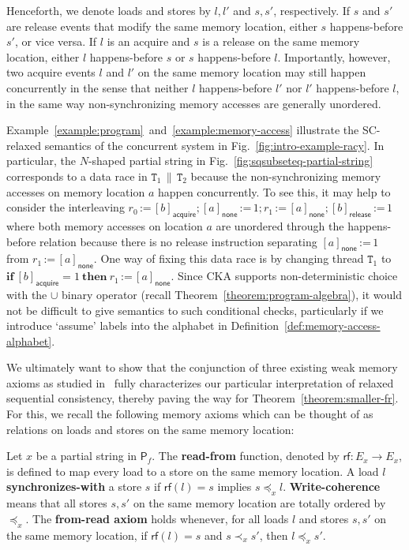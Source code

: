 \documentclass{llncs}
\newcommand{\sP}{\mathsf{P}}
\newcommand{\defn}[1]{\textbf{#1}}
\begin{document}
Henceforth, we denote loads and stores by $l, l'$ and $s, s'$, respectively. If $s$ and $s'$ are release events that modify the same memory location, either $s$ happens-before $s'$, or vice versa.  If $l$ is an acquire and $s$ is a release on the same memory location, either $l$ happens-before $s$ or $s$ happens-before $l$. Importantly, however, two acquire events $l$ and $l'$ on the same memory location may still happen concurrently in the sense that neither $l$ happens-before $l'$ nor $l'$ happens-before $l$, in the same way non-synchronizing memory accesses are generally unordered.

\begin{example}
\label{example:memory-access-with-data-race}
Example~\ref{example:program}~and~\ref{example:memory-access} illustrate the SC-relaxed semantics of the concurrent system in Fig.~\ref{fig:intro-example-racy}. In particular, the $N$-shaped partial string in Fig.~\ref{fig:sqsubseteq-partial-string} corresponds to a data race in $\texttt{T}_1\,\parallel\,\texttt{T}_2$ because the non-synchronizing memory accesses on memory location $a$ happen concurrently. To see this, it may help to consider the interleaving $r_0\, \texttt{:=}\, [b]_\mathsf{acquire} ; [a]_\mathsf{none}\,\texttt{:=}\,1 ; r_1\, \texttt{:=}\, [a]_\mathsf{none} ; [b]_\mathsf{release}\,\texttt{:=}\,1$ where both memory accesses on location $a$ are unordered through the happens-before relation because there is no release instruction separating $[a]_\mathsf{none}\,\texttt{:=}\,1$ from $r_1\, \texttt{:=}\, [a]_\mathsf{none}$. One way of fixing this data race is by changing thread $\texttt{T}_1$ to $\mathbf{if}\ [b]_\mathsf{acquire} = 1\ \mathbf{then}\ r_1\,\texttt{:=}\,[a]_\mathsf{none}$. Since CKA supports non-deterministic choice with the $\cup$ binary operator (recall Theorem~\ref{theorem:program-algebra}), it would not be difficult to give semantics to such conditional checks, particularly if we introduce `assume' labels into the alphabet in Definition~\ref{def:memory-access-alphabet}.
\end{example}

We ultimately want to show that the conjunction of three existing weak memory axioms as studied in~\cite{AMSS2012} fully characterizes our particular interpretation of relaxed sequential consistency, thereby paving the way for Theorem~\ref{theorem:smaller-fr}. For this, we recall the following memory axioms which can be thought of as relations on loads and stores on the same memory location:

\begin{definition}
\label{def:memory-axioms}
Let $x$ be a partial string in $\sP_f$. The \defn{read-from} function, denoted by $\mathsf{rf} \colon E_x \to E_x$, is defined to map every load to a store on the same memory location. A load $l$ \defn{synchronizes-with} a store $s$ if $\mathsf{rf}(l) = s$ implies $s \preceq_x l$. \defn{Write-coherence} means that all stores $s, s'$ on the same memory location are totally ordered by $\preceq_x$. The \defn{from-read axiom} holds whenever, for all loads $l$ and stores $s, s'$ on the same memory location, if $\mathsf{rf}(l) = s$ and $s \prec_x s'$, then $l \preceq_x s'$.
\end{definition}
\end{document}
